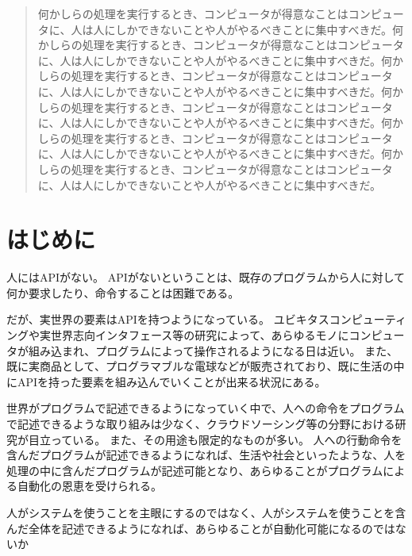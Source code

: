 \begin{abstract}

何かしらの処理を実行するとき、コンピュータが得意なことはコンピュータに、人は人にしかできないことや人がやるべきことに集中すべきだ。何かしらの処理を実行するとき、コンピュータが得意なことはコンピュータに、人は人にしかできないことや人がやるべきことに集中すべきだ。何かしらの処理を実行するとき、コンピュータが得意なことはコンピュータに、人は人にしかできないことや人がやるべきことに集中すべきだ。何かしらの処理を実行するとき、コンピュータが得意なことはコンピュータに、人は人にしかできないことや人がやるべきことに集中すべきだ。何かしらの処理を実行するとき、コンピュータが得意なことはコンピュータに、人は人にしかできないことや人がやるべきことに集中すべきだ。何かしらの処理を実行するとき、コンピュータが得意なことはコンピュータに、人は人にしかできないことや人がやるべきことに集中すべきだ。

\end{abstract}

\maketitle

\section{はじめに}\label{ux306fux3058ux3081ux306b}

人にはAPIがない。
APIがないということは、既存のプログラムから人に対して何か要求したり、命令することは困難である。

だが、実世界の要素はAPIを持つようになっている。
ユビキタスコンピューティングや実世界志向インタフェース等の研究によって、あらゆるモノにコンピュータが組み込まれ、プログラムによって操作されるようになる日は近い。
また、既に実商品として、プログラマブルな電球などが販売されており、既に生活の中にAPIを持った要素を組み込んでいくことが出来る状況にある。

世界がプログラムで記述できるようになっていく中で、人への命令をプログラムで記述できるような取り組みは少なく、クラウドソーシング等の分野における研究が目立っている。
また、その用途も限定的なものが多い。
人への行動命令を含んだプログラムが記述できるようになれば、生活や社会といったような、人を処理の中に含んだプログラムが記述可能となり、あらゆることがプログラムによる自動化の恩恵を受けられる。

人がシステムを使うことを主眼にするのではなく、人がシステムを使うことを含んだ全体を記述できるようになれば、あらゆることが自動化可能になるのではないか

